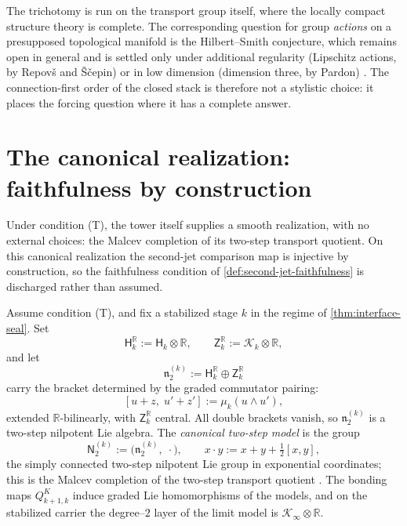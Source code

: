 \begin{remark}
	\label{rem:hilbert-smith}
	The trichotomy is run on the transport group itself, where the
	locally compact structure theory is complete.  The corresponding
	question for group \emph{actions} on a presupposed topological
	manifold is the Hilbert--Smith conjecture, which remains open in
	general and is settled only under additional regularity (Lipschitz
	actions, by Repov\v{s} and \v{S}\v{c}epin) or in low dimension
	(dimension three, by Pardon) \cite{RepovsScepin1997,Pardon2013}.  The connection-first order of the
	closed stack is therefore not a stylistic choice: it places the
	forcing question where it has a complete answer.
\end{remark}
\section{The canonical realization: faithfulness by construction}
\label{sec:interface-canonical}
Under condition \textup{(T)}, the tower itself supplies a smooth
realization, with no external choices: the Malcev completion of its
two-step transport quotient.  On this canonical realization the
second-jet comparison map is injective by construction, so the
faithfulness condition of \cref{def:second-jet-faithfulness} is
discharged rather than assumed.
\begin{definition}
	\label{def:canonical-model}
	Assume condition \textup{(T)}, and fix a stabilized stage \(k\) in
	the regime of \cref{thm:interface-seal}.  Set
	\[
		\mathsf H_k^{\mathbb R}:=\mathsf H_k\otimes\mathbb R,
		\qquad
		\mathsf Z_k^{\mathbb R}:=\mathcal K_k\otimes\mathbb R,
	\]
	and let
	\[
		\mathfrak n_2^{(k)}
		:=
		\mathsf H_k^{\mathbb R}\oplus\mathsf Z_k^{\mathbb R}
	\]
	carry the bracket determined by the graded commutator pairing:
	\[
		[u+z,\;u'+z']
		:=
		\mu_k(u\wedge u'),
	\]
	extended \(\mathbb R\)-bilinearly, with \(\mathsf Z_k^{\mathbb R}\)
	central.  All double brackets vanish, so
	\(\mathfrak n_2^{(k)}\) is a two-step nilpotent Lie algebra.  The
	\emph{canonical two-step model} is the group
	\[
		\mathsf N_2^{(k)}
		:=
		\bigl(\mathfrak n_2^{(k)},\;\cdot\bigr),
		\qquad
		x\cdot y:=x+y+\tfrac12[x,y],
	\]
	the simply connected two-step nilpotent Lie group in exponential
	coordinates; this is the Malcev completion of the two-step transport
	quotient \cite{Malcev1949}.  The bonding maps \(Q_{k+1,k}^{K}\) induce graded Lie
	homomorphisms of the models, and on the stabilized carrier the
	degree--\(2\) layer of the limit model is
	\(\mathcal K_\infty\otimes\mathbb R\).
\end{definition}
